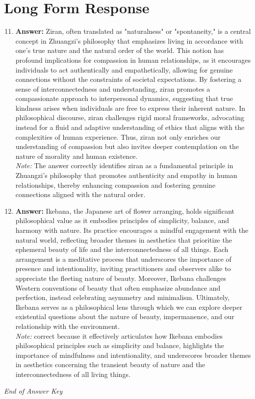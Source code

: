 \documentclass[12pt]{article}
\begin{document}
\section*{Long Form Response}
\begin{enumerate}[label=\arabic*.]
\setcounter{enumi}{10}
\item \textbf{Answer:} Ziran, often translated as "naturalness" or "spontaneity," is a central concept in Zhuangzi's philosophy that emphasizes living in accordance with one's true nature and the natural order of the world. This notion has profound implications for compassion in human relationships, as it encourages individuals to act authentically and empathetically, allowing for genuine connections without the constraints of societal expectations. By fostering a sense of interconnectedness and understanding, ziran promotes a compassionate approach to interpersonal dynamics, suggesting that true kindness arises when individuals are free to express their inherent nature. In philosophical discourse, ziran challenges rigid moral frameworks, advocating instead for a fluid and adaptive understanding of ethics that aligns with the complexities of human experience. Thus, ziran not only enriches our understanding of compassion but also invites deeper contemplation on the nature of morality and human existence.
\\ \textit{Note:} The answer correctly identifies ziran as a fundamental principle in Zhuangzi's philosophy that promotes authenticity and empathy in human relationships, thereby enhancing compassion and fostering genuine connections aligned with the natural order.
\item \textbf{Answer:} Ikebana, the Japanese art of flower arranging, holds significant philosophical value as it embodies principles of simplicity, balance, and harmony with nature. Its practice encourages a mindful engagement with the natural world, reflecting broader themes in aesthetics that prioritize the ephemeral beauty of life and the interconnectedness of all things. Each arrangement is a meditative process that underscores the importance of presence and intentionality, inviting practitioners and observers alike to appreciate the fleeting nature of beauty. Moreover, Ikebana challenges Western conventions of beauty that often emphasize abundance and perfection, instead celebrating asymmetry and minimalism. Ultimately, Ikebana serves as a philosophical lens through which we can explore deeper existential questions about the nature of beauty, impermanence, and our relationship with the environment.
\\ \textit{Note:} correct because it effectively articulates how Ikebana embodies philosophical principles such as simplicity and balance, highlights the importance of mindfulness and intentionality, and underscores broader themes in aesthetics concerning the transient beauty of nature and the interconnectedness of all living things.
\end{enumerate}

\vfill
\noindent\textit{End of Answer Key}
\end{document}
